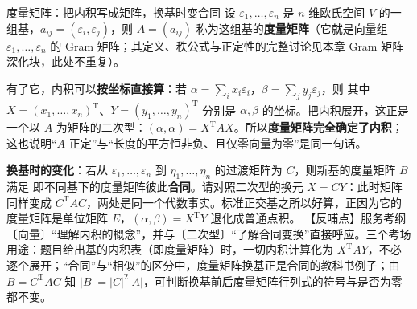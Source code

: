 \begin{fdeep}{度量矩阵：把内积写成矩阵，换基时变合同}
设 $\varepsilon_1,\dots,\varepsilon_n$ 是 $n$ 维欧氏空间 $V$ 的一组基，$a_{ij}=(\varepsilon_i,\varepsilon_j)$，则 $A=(a_{ij})$ 称为这组基的\textbf{度量矩阵}（它就是向量组 $\varepsilon_1,\dots,\varepsilon_n$ 的 Gram 矩阵；其定义、秩公式与正定性的完整讨论见本章 Gram 矩阵深化块，此处不重复）。

有了它，内积可以\textbf{按坐标直接算}：若 $\alpha=\sum_i x_i\varepsilon_i$，$\beta=\sum_j y_j\varepsilon_j$，则
其中 $X=(x_1,\dots,x_n)^{\mathrm T}$、$Y=(y_1,\dots,y_n)^{\mathrm T}$ 分别是 $\alpha,\beta$ 的坐标。把内积展开，这正是一个以 $A$ 为矩阵的二次型：$(\alpha,\alpha)=X^{\mathrm T}AX$。所以\textbf{度量矩阵完全确定了内积}；这也说明“$A$ 正定”与“长度的平方恒非负、且仅零向量为零”是同一句话。

\textbf{换基时的变化}：若从 $\varepsilon_1,\dots,\varepsilon_n$ 到 $\eta_1,\dots,\eta_n$ 的过渡矩阵为 $C$，则新基的度量矩阵 $B$ 满足
即不同基下的度量矩阵彼此\textbf{合同}。请对照二次型的换元 $X=CY$：此时矩阵同样变成 $C^{\mathrm T}AC$，两处是同一个代数事实。标准正交基之所以好算，正因为它的度量矩阵是单位矩阵 $E$，$(\alpha,\beta)=X^{\mathrm T}Y$ 退化成普通点积。
【反哺点】服务考纲〔向量〕“理解内积的概念”，并与〔二次型〕“了解合同变换”直接呼应。三个考场用途：题目给出基的内积表（即度量矩阵）时，一切内积计算化为 $X^{\mathrm T}AY$，不必逐个展开；“合同”与“相似”的区分中，度量矩阵换基正是合同的教科书例子；由 $B=C^{\mathrm T}AC$ 知 $|B|=|C|^{2}|A|$，可判断换基前后度量矩阵行列式的符号与是否为零都不变。
\end{fdeep}

